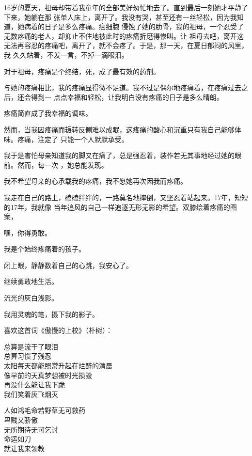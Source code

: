 \documentclass[12pt,a4paper]{article}
\def\blankrev{\vspace{1ex}}									%
\begin{document}
		16岁的夏天，祖母却带着我童年的全部美好匆忙地去了。直到最后一刻她才平静了下来，她躺在那
	张单人床上，离开了。我没有哭，甚至还有一丝轻松，因为我知道，她病着的日子是多么疼痛。癌细胞
	侵蚀了她的肋骨，我的祖母，一个忍受了无数疼痛的老人，却抑止不住地被此时的疼痛折磨得惨叫。让
	祖母去吧，离开这无法再容忍的疼痛吧，离开了，就不会疼了。于是，那一天，在夏日郁闷的风里，我
	久久站着，不发一言，不掉一滴眼泪。

		对于祖母，疼痛是个终结，死，成了最有效的药剂。

		与她的疼痛相比，我的疼痛显得微不足道。我不过是偶尔地疼痛着，在疼痛过去之后，还会得到一
	点点幸福和轻松，让我明白没有疼痛的日子是多么晴朗。

		疼痛简直成了我幸福的调味。

		然而，当我因疼痛而辗转反侧难以成眠，这疼痛的酸心和沉重只有我自己能够体味。疼痛，注定了
	只能一个人默默承受。

		我于是害怕母亲知道我的脚又在痛了，总是强忍着，装作若无其事地经过她的眼前。然而，每一次
	，她总能发现。

		我不希望母亲的心承载我的疼痛，我不愿她再次因我而疼痛。

		我走在自己的路上，磕磕绊绊的，一路莫名地摔倒，又坚忍着站起来。17年，短短的17年，我就像
	当年追风的自己一样追逐无形无影的希望。双膝绘着疼痛的图案，

		嘿，你得勇敢。

		我是个始终疼痛着的孩子。


		\blankrev
		闭上眼，静静数着自己的心跳，我安心了。\par
		继续勇敢地生活。


		\blankrev
		流光的灰白浅影。\par
		我用灵魂的笔，摄下我的影子。

		\blankrev
		喜欢这首词《傲慢的上校》（朴树）：

		\longpoem{}{}{}
		总算是流干了眼泪 \\
		总算习惯了残忍 \\
		太阳每天都能照常升起在烂醉的清晨 \\
		像早前的天真梦想被时光损毁 \\
		再没什么能让我下跪 \\
		我们笑着灰飞烟灭

		人如鸿毛命若野草无可救药 \\
		卑贱又骄傲 \\
		无所期待无可乞讨 \\
		命运如刀 \\
		就让我来领教
		\endlongpoem
\end{document}
